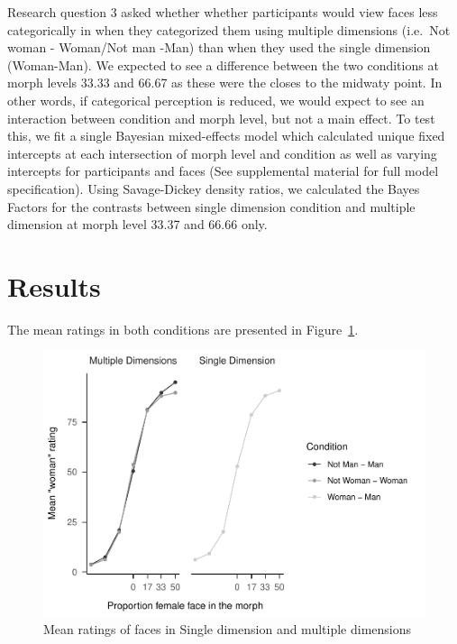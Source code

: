 \documentclass[
  man]{apa7}
\begin{document}
Research question 3 asked whether whether participants would view faces less categorically in when they categorized them using multiple dimensions (i.e.~Not woman - Woman/Not man -Man) than when they used the single dimension (Woman-Man). We expected to see a difference between the two conditions at morph levels 33.33 and 66.67 as these were the closes to the midwaty point. In other words, if categorical perception is reduced, we would expect to see an interaction between condition and morph level, but not a main effect. To test this, we fit a single Bayesian mixed-effects model which calculated unique fixed intercepts at each intersection of morph level and condition as well as varying intercepts for participants and faces (See supplemental material for full model specification). Using Savage-Dickey density ratios, we calculated the Bayes Factors for the contrasts between single dimension condition and multiple dimension at morph level 33.37 and 66.66 only.

\hypertarget{results-1}{%
\section{Results}\label{results-1}}

The mean ratings in both conditions are presented in Figure~\ref{fig:descriptives-two}.

\begin{figure}
\centering
\includegraphics{resp_opts_manus23022_files/figure-latex/descriptives-two-1.pdf}
\caption{\label{fig:descriptives-two}Mean ratings of faces in Single dimension and multiple dimensions}
\end{figure}
\end{document}
